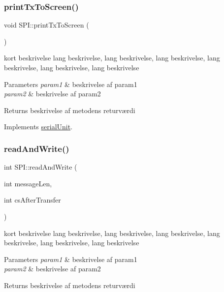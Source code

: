 \subsubsection{\texorpdfstring{print\+Tx\+To\+Screen()}{printTxToScreen()}}
{\footnotesize\ttfamily void S\+P\+I\+::print\+Tx\+To\+Screen (\begin{DoxyParamCaption}{ }\end{DoxyParamCaption})\hspace{0.3cm}{\ttfamily [virtual]}}



kort beskrivelse lang beskrivelse, lang beskrivelse, lang beskrivelse, lang beskrivelse, lang beskrivelse, lang beskrivelse 


\begin{DoxyParams}{Parameters}
{\em param1} & beskrivelse af param1 \\
\hline
{\em param2} & beskrivelse af param2 \\
\hline
\end{DoxyParams}
\begin{DoxyReturn}{Returns}
beskrivelse af metodens returværdi 
\end{DoxyReturn}


Implements \hyperlink{classserialUnit_a48e5dcf17a5a551351d7569c43cf96ad}{serial\+Unit}.

\mbox{\label{classSPI_ac50b3f5491e294aef6806f4e131cbd0e}} 
\subsubsection{\texorpdfstring{read\+And\+Write()}{readAndWrite()}}
{\footnotesize\ttfamily int S\+P\+I\+::read\+And\+Write (\begin{DoxyParamCaption}\item[{int}]{message\+Len,  }\item[{int}]{cs\+After\+Transfer }\end{DoxyParamCaption})\hspace{0.3cm}{\ttfamily [virtual]}}



kort beskrivelse lang beskrivelse, lang beskrivelse, lang beskrivelse, lang beskrivelse, lang beskrivelse, lang beskrivelse 


\begin{DoxyParams}{Parameters}
{\em param1} & beskrivelse af param1 \\
\hline
{\em param2} & beskrivelse af param2 \\
\hline
\end{DoxyParams}
\begin{DoxyReturn}{Returns}
beskrivelse af metodens returværdi 
\end{DoxyReturn}


